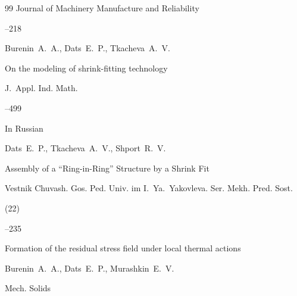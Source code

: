 \begin{thebibliography}{99}
\jour Journal of Machinery Manufacture and Reliability




--218








\by Burenin~A.~A., Dats~E.~P., Tkacheva~A.~V.

\paper On the modeling of shrink-fitting technology

\jour J.~Appl. Ind. Math. 




–499








\lang In Russian

\by Dats~E.~P., Tkacheva~A.~V., Shport~R.~V.

\paper Assembly of a ``Ring-in-Ring'' Structure by a Shrink Fit

\jour  Vestnik Chuvash. Gos. Ped. Univ. im I.~Ya.~Yakovleva. Ser. Mekh. Pred. Sost.


(22)

--235






\paper Formation of the residual stress field under local thermal actions 

\by Burenin~A.~A., Dats~E.~P., Murashkin~E.~V.



\jour Mech. Solids




\end{thebibliography}
